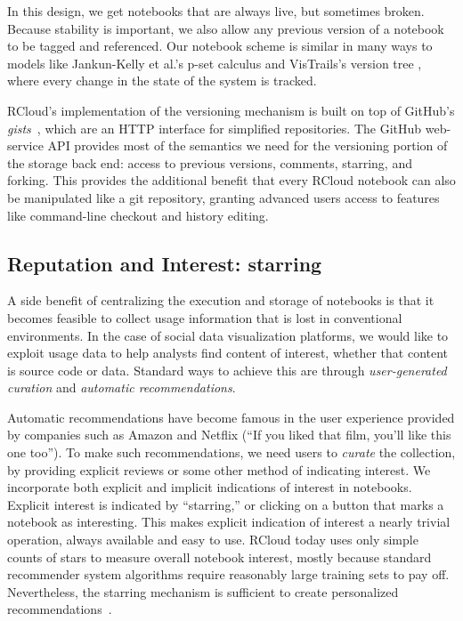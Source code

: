 In this design, we get notebooks that are always live,
but sometimes broken. Because stability is important, we also
allow any previous version of a notebook to be tagged and referenced.
Our notebook scheme is similar in many ways to models like
Jankun-Kelly et al.'s p-set calculus
\cite{Jankun-Kelly:2007:MFV} and VisTrails's version tree
\cite{Callahan:2006:VVM}, where every change in the state of the
system is tracked.

RCloud's implementation of the versioning mechanism is built on
top of GitHub's \emph{gists}~\cite{GitHub:2014:GG}, which are an HTTP
interface for simplified repositories. The GitHub web-service API
provides most of the semantics we need for the versioning portion of
the storage back end: access to previous versions, comments, starring,
and forking. This provides the additional benefit that every RCloud
notebook can also be manipulated like a git repository, granting advanced users
access to features like command-line checkout and history
editing.

\subsection{Reputation and Interest: starring\label{sec:starring}}

A side benefit of centralizing the execution and storage of
notebooks is that it becomes feasible to collect usage information
that is lost in conventional environments.
In the case of social data visualization
platforms, we would like to exploit usage data to help analysts
find content of interest, whether that content is source code
or data. Standard ways to achieve this are through
\emph{user-generated curation} and \emph{automatic recommendations}.

Automatic recommendations have become famous in the user experience
provided by companies such as Amazon and Netflix (``If you liked
that film, you'll like this one too''). To make such
recommendations, we need users to \emph{curate} the collection, by
providing explicit reviews or some other method of indicating interest.
We incorporate both explicit and implicit indications of interest
in notebooks. Explicit interest is indicated by ``starring,'' or
clicking on a button that marks a notebook as interesting.
This makes explicit indication of interest a nearly trivial operation,
always available and easy to use.
%
RCloud today uses only simple counts of stars to measure overall
notebook interest, mostly because standard
recommender system algorithms 
require reasonably large training sets to pay off.
Nevertheless, the starring mechanism is sufficient
to create personalized recommendations~\cite{Hu:2008:CFF}.

